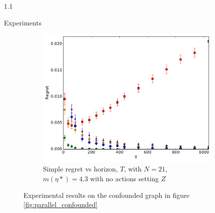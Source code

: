 \documentclass[12pt]{beamer}
\newlength{\onecolwid}
\begin{document}
\begin{frame}[t]
\begin{columns}[t]
\begin{column}{1.1\onecolwid}
\begin{block}{Experiments}
\begin{figure}[H]
\begin{subfigure}[t]{0.3\textwidth}
    \end{subfigure}\hfill
    \begin{subfigure}[t]{0.3\textwidth}
    		\centering
    		\includegraphics[width=\textwidth]{experiment5_20161023_2118.pdf}
    		\caption{Simple regret vs horizon, $T$, with $N = 21$, $m(\eta*)=4.3$ with no actions setting $Z$}
    		\label{fig:simple_vs_T_misspecified}
    \end{subfigure}
    \caption{Experimental results on the confounded graph in figure \ref{fig:parallel_confounded}}
    \label{fig:experiments_confounded}
\end{figure}

\end{block}

\end{column}


\end{columns}
\end{frame}
\end{document}
